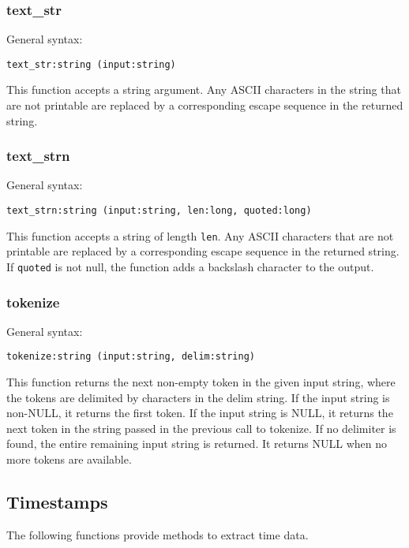 \documentclass[twoside,english]{article}
\newenvironment{vindent}
{\begin{list}{}{\setlength{\listparindent}{6pt}}
\item[]}
{\end{list}}
\begin{document}
\subsubsection{text\_str}
General syntax:

\begin{vindent}
\begin{verbatim}
text_str:string (input:string)
\end{verbatim}
\end{vindent}
This function accepts a string argument. Any ASCII characters in the string
that are not printable are replaced by a corresponding escape sequence in
the returned string.


\subsubsection{text\_strn}
General syntax:

\begin{vindent}
\begin{verbatim}
text_strn:string (input:string, len:long, quoted:long)
\end{verbatim}
\end{vindent}
This function accepts a string of length \texttt{len}. Any ASCII characters
that are not printable are replaced by a corresponding escape sequence in
the returned string. If \texttt{quoted} is not null, the function adds a
backslash character to the output.


\subsubsection{tokenize}

General syntax:

\begin{vindent}
\begin{verbatim}
tokenize:string (input:string, delim:string)
\end{verbatim}
\end{vindent}
This function returns the next non-empty token in the given input string,
where the tokens are delimited by characters in the delim string.
If the input string is non-NULL, it returns the first token. If the input string
is NULL, it returns the next token in the string passed in the previous call
to tokenize. If no delimiter is found, the entire remaining input string
is returned.  It returns NULL when no more tokens are available.


\subsection{Timestamps}
The following functions provide methods to extract time data.
\end{document}
